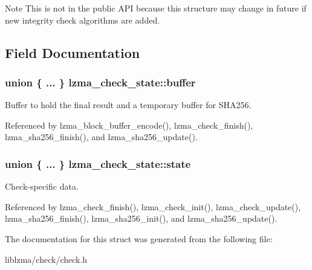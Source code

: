 \begin{DoxyNote}{Note}
This is not in the public A\-P\-I because this structure may change in future if new integrity check algorithms are added. 
\end{DoxyNote}


\subsection{Field Documentation}
\subsubsection[{buffer}]{\setlength{\rightskip}{0pt plus 5cm}union \{ ... \}   lzma\-\_\-check\-\_\-state\-::buffer}\label{structlzma__check__state_a66d54715269b349088561ee800cd2356}


Buffer to hold the final result and a temporary buffer for S\-H\-A256. 



Referenced by lzma\-\_\-block\-\_\-buffer\-\_\-encode(), lzma\-\_\-check\-\_\-finish(), lzma\-\_\-sha256\-\_\-finish(), and lzma\-\_\-sha256\-\_\-update().

\subsubsection[{state}]{\setlength{\rightskip}{0pt plus 5cm}union \{ ... \}   lzma\-\_\-check\-\_\-state\-::state}\label{structlzma__check__state_af30e2332a697d110c3fb2e4aa6b99178}


Check-\/specific data. 



Referenced by lzma\-\_\-check\-\_\-finish(), lzma\-\_\-check\-\_\-init(), lzma\-\_\-check\-\_\-update(), lzma\-\_\-sha256\-\_\-finish(), lzma\-\_\-sha256\-\_\-init(), and lzma\-\_\-sha256\-\_\-update().



The documentation for this struct was generated from the following file\-:\begin{DoxyCompactItemize}
\item 
liblzma/check/check.\-h\end{DoxyCompactItemize}
